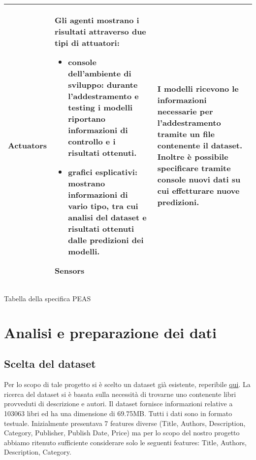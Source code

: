 \documentclass[12pt,oneside]{article}
\begin{document}
\begin{enumerate}
\begin{longtable}{ | p{3cm} | p{11cm} | }
\begin{itemize}
    \end{itemize}
    \hline
    \textbf{Actuators} & Gli agenti mostrano i risultati attraverso due tipi di attuatori: \begin{itemize}
    \item console dell'ambiente di sviluppo: durante l'addestramento e testing i modelli riportano informazioni di controllo e i risultati ottenuti.
    \item grafici esplicativi: mostrano informazioni di vario tipo, tra cui analisi del dataset e risultati ottenuti dalle predizioni dei modelli.\end{itemize}
    \hline
    \textbf{Sensors} & I modelli ricevono le informazioni necessarie per l'addestramento tramite un file contenente il dataset. Inoltre è possibile specificare tramite console nuovi dati su cui effetturare nuove predizioni. \\
    \hline
    
    \end{longtable}
   \caption{Tabella della specifica PEAS}
\label{table:ta}
\end{enumerate}

    

\section{Analisi e preparazione dei dati}
    \begin{enumerate}
    \subsection{Scelta del dataset}
    \begin{justify}
    Per lo scopo di tale progetto si è scelto un dataset già esistente, reperibile \href{https://www.kaggle.com/datasets/elvinrustam/books-dataset}{qui}. La ricerca del dataset si è basata sulla necessità di trovarne uno contenente libri provveduti di descrizione e autori. Il dataset fornisce informazioni relative a 103063 libri ed ha una dimensione di 69.75MB. Tutti i dati sono in formato testuale. Inizialmente presentava 7 features diverse (Title, Authors, Description, Category, Publisher, Publish Date, Price) ma per lo scopo del nostro progetto abbiamo ritenuto sufficiente considerare solo le seguenti features: Title, Authors, Description, Category.  
    \end{justify}
    \end{enumerate}
\end{document}
